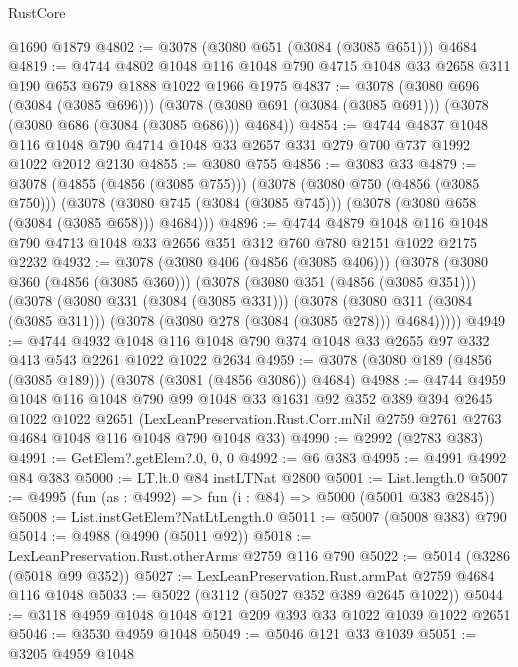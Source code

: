 \begin{lexlean}{RustCore}
\begin{coremodule}
    @1690
    @1879
@4802 := @3078 (@3080 @651 (@3084 (@3085 @651))) @4684
@4819 := @4744
    @4802
    @1048
    @116
    @1048
    @790
    @4715
    @1048
    @33
    @2658
    @311
    @190
    @653
    @679
    @1888
    @1022
    @1966
    @1975
@4837 := @3078
    (@3080 @696 (@3084 (@3085 @696)))
    (@3078 (@3080 @691 (@3084 (@3085 @691))) (@3078 (@3080 @686 (@3084 (@3085 @686))) @4684))
@4854 := @4744
    @4837
    @1048
    @116
    @1048
    @790
    @4714
    @1048
    @33
    @2657
    @331
    @279
    @700
    @737
    @1992
    @1022
    @2012
    @2130
@4855 := @3080 @755
@4856 := @3083 @33
@4879 := @3078
    (@4855 (@4856 (@3085 @755)))
    (@3078
      (@3080 @750 (@4856 (@3085 @750)))
      (@3078 (@3080 @745 (@3084 (@3085 @745))) (@3078 (@3080 @658 (@3084 (@3085 @658))) @4684)))
@4896 := @4744
    @4879
    @1048
    @116
    @1048
    @790
    @4713
    @1048
    @33
    @2656
    @351
    @312
    @760
    @780
    @2151
    @1022
    @2175
    @2232
@4932 := @3078
    (@3080 @406 (@4856 (@3085 @406)))
    (@3078
      (@3080 @360 (@4856 (@3085 @360)))
      (@3078
        (@3080 @351 (@4856 (@3085 @351)))
        (@3078
          (@3080 @331 (@3084 (@3085 @331)))
          (@3078
            (@3080 @311 (@3084 (@3085 @311)))
            (@3078 (@3080 @278 (@3084 (@3085 @278))) @4684)))))
@4949 := @4744
    @4932
    @1048
    @116
    @1048
    @790
    @374
    @1048
    @33
    @2655
    @97
    @332
    @413
    @543
    @2261
    @1022
    @1022
    @2634
@4959 := @3078 (@3080 @189 (@4856 (@3085 @189))) (@3078 (@3081 (@4856 @3086)) @4684)
@4988 := @4744
    @4959
    @1048
    @116
    @1048
    @790
    @99
    @1048
    @33
    @1631
    @92
    @352
    @389
    @394
    @2645
    @1022
    @1022
    @2651
    (LexLeanPreservation.Rust.Corr.mNil @2759 @2761 @2763 @4684 @1048 @116 @1048 @790 @1048 @33)
@4990 := @2992 (@2783 @383)
@4991 := GetElem?.getElem?.{0, 0, 0}
@4992 := @6 @383
@4995 := @4991 @4992 @84 @383
@5000 := LT.lt.{0} @84 instLTNat @2800
@5001 := List.length.{0}
@5007 := @4995 (fun (as : @4992) => fun (i : @84) => @5000 (@5001 @383 @2845))
@5008 := List.instGetElem?NatLtLength.{0}
@5011 := @5007 (@5008 @383) @790
@5014 := @4988 (@4990 (@5011 @92))
@5018 := LexLeanPreservation.Rust.otherArms @2759 @116 @790
@5022 := @5014 (@3286 (@5018 @99 @352))
@5027 := LexLeanPreservation.Rust.armPat @2759 @4684 @116 @1048
@5033 := @5022 (@3112 (@5027 @352 @389 @2645 @1022))
@5044 := @3118 @4959 @1048 @1048 @121 @209 @393 @33 @1022 @1039 @1022 @2651
@5046 := @3530 @4959 @1048
@5049 := @5046 @121 @33 @1039
@5051 := @3205 @4959 @1048

\end{coremodule}
\end{lexlean}
